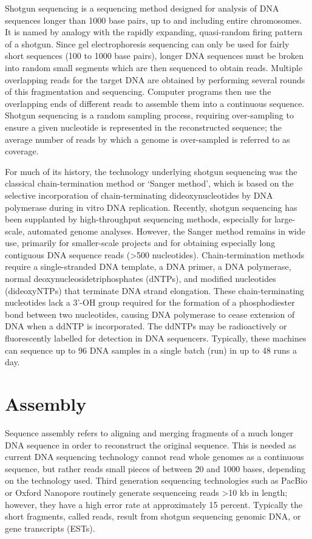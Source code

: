 Shotgun sequencing is a sequencing method designed for analysis of DNA sequences longer than 1000 base pairs, up to and including entire chromosomes. It is named by analogy with the rapidly expanding, quasi-random firing pattern of a shotgun. Since gel electrophoresis sequencing can only be used for fairly short sequences (100 to 1000 base pairs), longer DNA sequences must be broken into random small segments which are then sequenced to obtain reads. Multiple overlapping reads for the target DNA are obtained by performing several rounds of this fragmentation and sequencing. Computer programs then use the overlapping ends of different reads to assemble them into a continuous sequence. Shotgun sequencing is a random sampling process, requiring over-sampling to ensure a given nucleotide is represented in the reconstructed sequence; the average number of reads by which a genome is over-sampled is referred to as coverage.

For much of its history, the technology underlying shotgun sequencing was the classical chain-termination method or `Sanger method', which is based on the selective incorporation of chain-terminating dideoxynucleotides by DNA polymerase during in vitro DNA replication. Recently, shotgun sequencing has been supplanted by high-throughput sequencing methods, especially for large-scale, automated genome analyses. However, the Sanger method remains in wide use, primarily for smaller-scale projects and for obtaining especially long contiguous DNA sequence reads (\textgreater{}500 nucleotides). Chain-termination methods require a single-stranded DNA template, a DNA primer, a DNA polymerase, normal deoxynucleosidetriphosphates (dNTPs), and modified nucleotides (dideoxyNTPs) that terminate DNA strand elongation. These chain-terminating nucleotides lack a 3'-OH group required for the formation of a phosphodiester bond between two nucleotides, causing DNA polymerase to cease extension of DNA when a ddNTP is incorporated. The ddNTPs may be radioactively or fluorescently labelled for detection in DNA sequencers. Typically, these machines can sequence up to 96 DNA samples in a single batch (run) in up to 48 runs a day.

\hypertarget{assembly}{%
\section{Assembly}\label{assembly}}

Sequence assembly refers to aligning and merging fragments of a much longer DNA sequence in order to reconstruct the original sequence. This is needed as current DNA sequencing technology cannot read whole genomes as a continuous sequence, but rather reads small pieces of between 20 and 1000 bases, depending on the technology used. Third generation sequencing technologies such as PacBio or Oxford Nanopore routinely generate sequenceing reads \textgreater{}10 kb in length; however, they have a high error rate at approximately 15 percent. Typically the short fragments, called reads, result from shotgun sequencing genomic DNA, or gene transcripts (ESTs).

